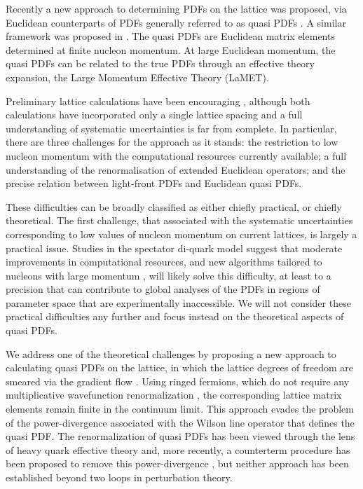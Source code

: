 Recently a new approach to determining PDFs on the lattice was proposed, via 
Euclidean counterparts of PDFs generally referred to as quasi PDFs  
\cite{Ji:2013dva,Ji:2014gla,Lin:2014zya,Gamberg:2014zwa,Ji:2015jwa,
Alexandrou:2015rja,Chen:2016utp}. A similar framework was proposed in 
\cite{Ma:2014jla}. The 
quasi PDFs are Euclidean matrix elements determined at finite nucleon 
momentum. At large Euclidean momentum, the quasi PDFs can be related to the 
true PDFs through an effective theory expansion, the Large Momentum Effective 
Theory (LaMET).

Preliminary lattice calculations have been encouraging 
\cite{Lin:2014zya,Alexandrou:2015rja}, although both 
calculations have incorporated only a single lattice spacing and a full 
understanding of systematic uncertainties is far from complete. In particular, 
there are three challenges for the approach as it stands: the 
restriction to low nucleon momentum with the computational resources currently 
available; a full understanding of the renormalisation of extended Euclidean 
operators; and the precise relation between light-front PDFs and Euclidean quasi 
PDFs. 

These difficulties can be broadly classified as either chiefly practical, or 
chiefly theoretical. The first challenge, that associated with the systematic 
uncertainties corresponding to low values of nucleon momentum on current 
lattices, is largely a practical issue. Studies in the spectator 
di-quark model \cite{Gamberg:2014zwa} suggest that moderate improvements in 
computational resources, and new algorithms tailored to nucleons with large 
momentum \cite{Bali:2016lva}, 
will likely solve this difficulty, at least to a precision that can contribute 
to global analyses of the PDFs in regions of parameter space that are 
experimentally inaccessible. We will not consider these practical 
difficulties any further and focus instead on the theoretical 
aspects of quasi PDFs.

We address one of the theoretical challenges by proposing a new approach to 
calculating quasi PDFs on the lattice, in which the lattice degrees of freedom 
are smeared via the gradient flow 
\cite{Narayanan:2006rf,Luscher:2011bx,Luscher:2013cpa}. Using ringed 
fermions, which do not require any multiplicative wavefunction renormalization
\cite{Makino:2014taa,Hieda:2016lly}, the corresponding lattice matrix elements 
remain finite in the continuum limit. This approach evades the problem of the 
power-divergence associated with the Wilson line operator that defines the 
quasi PDF. The renormalization of quasi PDFs has been viewed through the lens 
of heavy quark effective theory \cite{Ji:2015jwa} and, more recently, a 
counterterm procedure has been proposed to remove this power-divergence 
\cite{Chen:2016fxx,Ishikawa:2016znu}, but neither approach has been established 
beyond two loops in perturbation theory.


